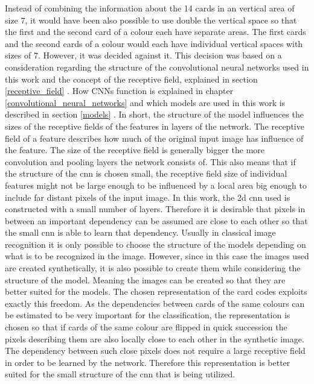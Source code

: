 Instead of combining the information about the 14 cards in an vertical area of size 7, it would have been also possible to use double the vertical space so that the first and the second card of a colour each have separate areas. The first cards and the second cards of a colour would each have individual vertical spaces with sizes of 7. However, it was decided against it. This decision was based on a consideration regarding the structure of the convolutional neural networks used in this work and the concept of the receptive field, explained in section \ref{receptive_field} . How CNNs function is explained in chapter \ref{convolutional_neural_networks}  and which models are used in this work is described in section \ref{models} . In short, the structure of the model influences the sizes of the receptive fields of the features in layers of the network. The receptive field of a feature describes how much of the original input image has influence of the feature. The size of the receptive field is generally bigger the more convolution and pooling layers the network consists of. This also means that if the structure of the cnn is chosen small, the receptive field size of individual features might not be large enough to be influenced by a local area big enough to include far distant pixels of the input image. In this work, the 2d cnn used is constructed with a small number of layers. Therefore it is desirable that pixels in between an important dependency can be assumed are close to each other so that the small cnn is able to learn that dependency. Usually in classical image recognition it is only possible to choose the structure of the models depending on what is to be recognized in the image. However, since in this case the images used are created synthetically, it is also possible to create them while considering the structure of the model. Meaning the images can be created so that they are better suited for the models. The chosen representation of the card codes exploits exactly this freedom. As the dependencies between cards of the same colours can be estimated to be very important for the classification, the representation is chosen so that if cards of the same colour are flipped in quick succession the pixels describing them are also locally close to each other in the synthetic image. The dependency between such close pixels does not require a large receptive field in order to be learned by the network. Therefore this representation is better suited for the small structure of the cnn that is being utilized. 


